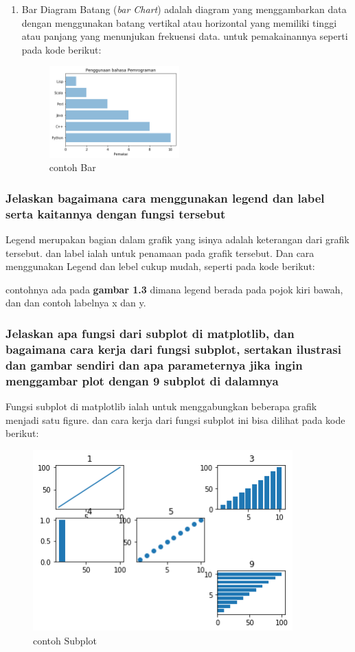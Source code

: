 \begin{enumerate}
\item Bar \hfill \break
Diagram Batang (\textit{bar Chart}) adalah diagram yang menggambarkan data dengan menggunakan batang vertikal atau horizontal yang memiliki tinggi atau panjang yang menunjukan frekuensi data. untuk pemakainannya seperti pada kode berikut:

\begin{figure}[ht]	
    \includegraphics[width=5cm]{figures/6/1174083/Teori/5.png}
    \centering
    \caption{contoh Bar}
    \label{5}
\end{figure}
\end{enumerate}

\subsubsection{Jelaskan bagaimana cara menggunakan legend dan label serta kaitannya dengan fungsi tersebut}
\hfill \break
Legend merupakan bagian dalam grafik yang isinya adalah keterangan dari grafik tersebut. dan label ialah untuk penamaan pada grafik tersebut. Dan cara menggunakan Legend dan lebel cukup mudah, seperti pada kode berikut:

contohnya ada pada \textbf{gambar 1.3} dimana legend berada pada pojok kiri bawah, dan dan contoh labelnya x dan y.

\subsubsection{Jelaskan apa fungsi dari subplot di matplotlib, dan bagaimana cara kerja dari fungsi subplot, sertakan ilustrasi dan gambar sendiri dan apa parameternya jika ingin menggambar plot dengan 9 subplot di dalamnya}
\hfill \break
Fungsi subplot di matplotlib ialah untuk menggabungkan beberapa grafik menjadi satu figure. dan cara kerja dari fungsi subplot ini bisa dilihat pada kode berikut:

\begin{figure}[ht]	
    \includegraphics[width=10cm]{figures/6/1174083/Teori/6.png}
    \centering
    \caption{contoh Subplot}
    \label{5}
\end{figure}
